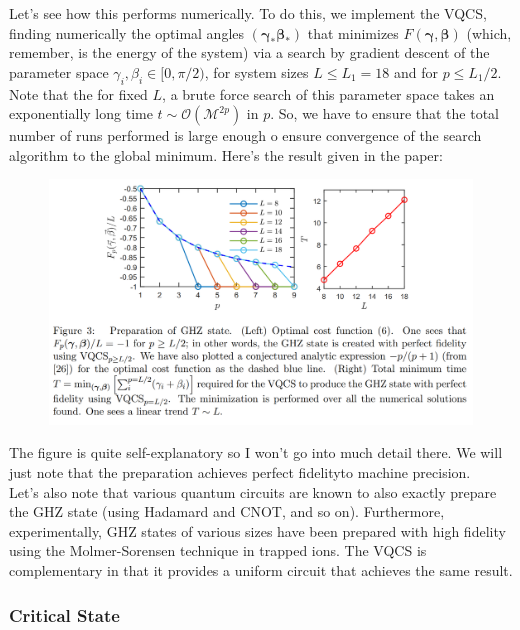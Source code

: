 \documentclass{book}
\theoremstyle{definition}
\begin{document}
Let's see how this performs numerically. To do this, we implement the VQCS, finding numerically the optimal angles $(\bm\gamma_* \bm\beta_*)$ that minimizes $F(\bm\gamma, \bm\beta)$ (which, remember, is the energy of the system) via a search by gradient descent of the parameter space $\gamma_i, \beta_i \in [0, \pi/2)$, for system sizes $L \leq L_1 = 18$ and for $p \leq L_1/2$. Note that the for fixed $L$, a brute force search of this parameter space takes an exponentially long time $t\sim \mathcal{O}(\mathcal{M}^{2p})$ in $p$. So, we have to ensure that the total number of runs performed is large enough o ensure convergence of the search algorithm to the global minimum.  Here's the result given in the paper:
\begin{figure}[!htb]
	\centering
	\includegraphics[scale=0.25]{ghz}
\end{figure}

The figure is quite self-explanatory so I won't go into much detail there.  We will just note that the preparation achieves perfect fidelityto machine precision. \\



Let's also note that various quantum circuits are known to also exactly prepare the GHZ state (using Hadamard and CNOT, and so on). Furthermore, experimentally, GHZ states of various sizes have been prepared with high fidelity using the Molmer-Sorensen technique in trapped ions. The VQCS is complementary in that it provides a uniform circuit that achieves the same result. 


 

\subsubsection{Critical State}
\end{document}
